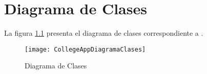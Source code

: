 %
%
%
%

\cleardoublepage
\chapter{Diagrama de Clases}
\label{chap:classdiagram}

La figura \ref{fig:ClassDiagram} presenta el diagrama de clases correspondiente a \CollegeApp.

\begin{figure}[h !]
	\centering
	\texttt{[image: CollegeAppDiagramaClases]}
	\caption{Diagrama de Clases}
	\label{fig:ClassDiagram}
\end{figure}
